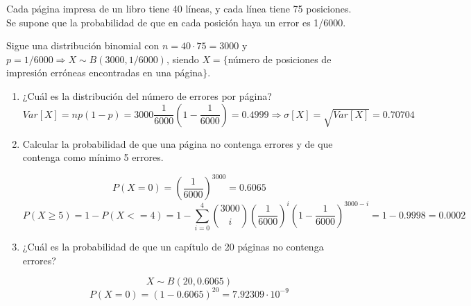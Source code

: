 \begin{ejer}
Cada página impresa de un libro tiene 40 líneas, y cada línea tiene 75 posiciones. Se supone que la probabilidad de que en cada posición haya un error es 1/6000.

\end{ejer}
\begin{sol}
Sigue una distribución binomial con $n=40\cdot 75=3000$ y $p=1/6000 \Longrightarrow X \sim B(3000, 1/6000)$, siendo $X=\{$número de posiciones de impresión erróneas encontradas en una página$\}$.


\begin{enumerate}
\item ¿Cuál es la distribución del número de errores por página?
\[
Var[X] = np(1-p) = 3000\frac{1}{6000}(1-\frac{1}{6000})=0.4999 \Longrightarrow \sigma [X] = \sqrt{Var[X]} = 0.70704
\]

\item Calcular la probabilidad de que una página no contenga errores y de que contenga como mínimo 5 errores.

\[
P(X=0)= (\frac{1}{6000})^{3000} = 0.6065
\]
\[
P(X \geq 5)=1 - P(X<=4) = 1 - \sum_{i=0}^4\binom{3000}{i}(\frac{1}{6000})^i(1-\frac{1}{6000})^{3000-i}=1-0.9998 = 0.0002
\]

\item ¿Cuál es la probabilidad de que un capítulo de 20 páginas no contenga errores?

\[
X \sim B(20, 0.6065)
\]
\[
P(X=0) = (1-0.6065)^{20} = 7.92309 \cdot  10^{-9}
\]

\end{enumerate}

\end{sol}

